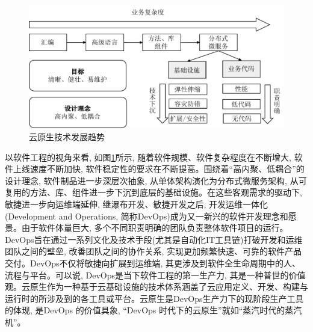 \begin{figure}[h] %
    \centering %
    \includegraphics[width=0.9 \textwidth]{FIGs/chapter2/cloud_native_development.pdf} %
    \caption{云原生技术发展趋势} %
    \label{cloud_native_development} %
\end{figure}%

以软件工程的视角来看, 如图\ref{cloud_native_development}所示, 随着软件规模、软件复杂程度在不断增大, 软件上线速度不断加快, 软件稳定性的要求在不断提高。围绕着“高内聚、低耦合”的设计理念, 软件制品进一步深层次抽象, 从单体架构演化为分布式微服务架构, 从可复用的方法、库、组件进一步下沉到底层的基础设施。在这些客观需求的驱动下, 敏捷进一步向运维端延伸, 继瀑布开发、敏捷开发之后, 开发运维一体化(Development and Operations, 简称DevOps)成为又一新兴的软件开发理念和愿景。由于软件体量巨大, 多个不同职责明确的团队负责整体软件项目的运行。DevOps旨在通过一系列文化及技术手段(尤其是自动化IT工具链)打破开发和运维团队之间的壁垒, 改善团队之间的协作关系, 实现更加频繁快速、可靠的软件产品交付\cite{ChinaDevops}。DevOps不仅将敏捷向扩展到运维端, 其更涉及到软件全生命周期中的人、流程与平台。可以说, DevOps是当下软件工程的第一生产力, 其是一种普世的价值观。云原生作为一种基于云基础设施的技术体系涵盖了云应用定义、开发、构建与运行时的所涉及到的各工具或平台。云原生是DevOps生产力下的现阶段生产工具的体现, 是DevOps 的价值具象, “DevOps 时代下的云原生”就如“蒸汽时代的蒸汽机”。


